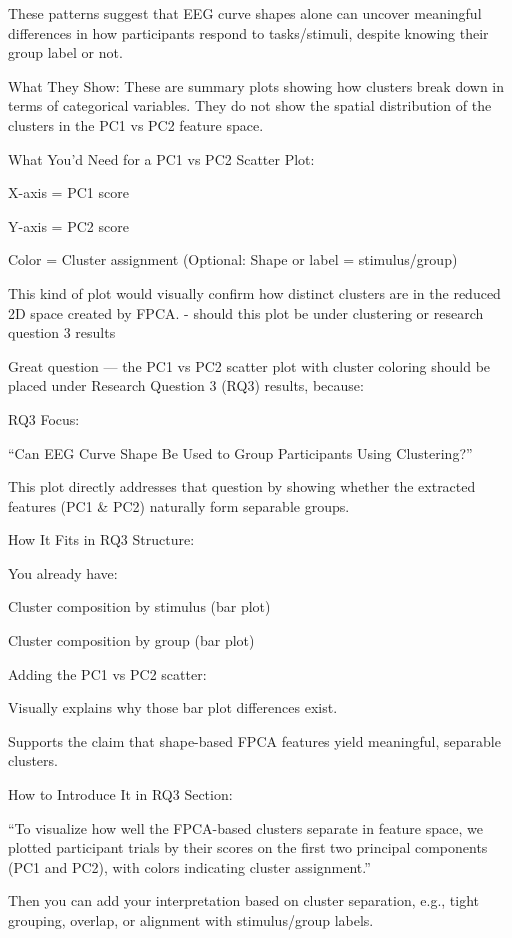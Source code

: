 \documentclass{article}
\begin{document}
These patterns suggest that EEG curve shapes alone can uncover
meaningful differences in how participants respond to tasks/stimuli,
despite knowing their group label or not.

What They Show: These are summary plots showing how clusters break down
in terms of categorical variables. They do not show the spatial
distribution of the clusters in the PC1 vs PC2 feature space.

What You'd Need for a PC1 vs PC2 Scatter Plot:

X-axis = PC1 score

Y-axis = PC2 score

Color = Cluster assignment (Optional: Shape or label = stimulus/group)

This kind of plot would visually confirm how distinct clusters are in
the reduced 2D space created by FPCA. - should this plot be under
clustering or research question 3 results

Great question --- the PC1 vs PC2 scatter plot with cluster coloring
should be placed under Research Question 3 (RQ3) results, because:

RQ3 Focus:

``Can EEG Curve Shape Be Used to Group Participants Using Clustering?''

This plot directly addresses that question by showing whether the
extracted features (PC1 \& PC2) naturally form separable groups.

How It Fits in RQ3 Structure:

You already have:

Cluster composition by stimulus (bar plot)

Cluster composition by group (bar plot)

Adding the PC1 vs PC2 scatter:

Visually explains why those bar plot differences exist.

Supports the claim that shape-based FPCA features yield meaningful,
separable clusters.

How to Introduce It in RQ3 Section:

``To visualize how well the FPCA-based clusters separate in feature
space, we plotted participant trials by their scores on the first two
principal components (PC1 and PC2), with colors indicating cluster
assignment.''

Then you can add your interpretation based on cluster separation, e.g.,
tight grouping, overlap, or alignment with stimulus/group labels.
\end{document}
